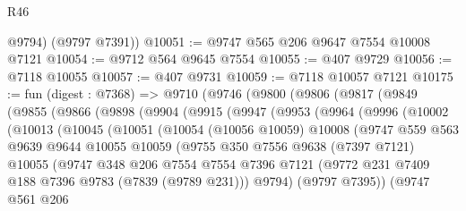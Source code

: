 \begin{lexlean}{R46}
\begin{coremodule}
        @9794)
      (@9797 @7391))
@10051 := @9747 @565 @206 @9647 @7554 @10008 @7121
@10054 := @9712 @564 @9645 @7554
@10055 := @407 @9729
@10056 := @7118 @10055
@10057 := @407 @9731
@10059 := @7118 @10057 @7121
@10175 := fun (digest : @7368) =>
  @9710
    (@9746
      (@9800
        (@9806
          (@9817
            (@9849
              (@9855
                (@9866
                  (@9898
                    (@9904
                      (@9915
                        (@9947
                          (@9953
                            (@9964
                              (@9996
                                (@10002
                                  (@10013
                                    (@10045
                                      (@10051
                                        (@10054
                                          (@10056 @10059)
                                          @10008
                                          (@9747
                                            @559
                                            @563
                                            @9639
                                            @9644
                                            @10055
                                            @10059
                                            (@9755
                                              @350
                                              @7556
                                              @9638
                                              (@7397 @7121)
                                              @10055
                                              (@9747
                                                @348
                                                @206
                                                @7554
                                                @7554
                                                @7396
                                                @7121
                                                (@9772
                                                  @231
                                                  @7409
                                                  @188
                                                  @7396
                                                  @9783
                                                  (@7839 (@9789 @231)))
                                                @9794)
                                              (@9797 @7395))
                                            (@9747
                                              @561
                                              @206

\end{coremodule}
\end{lexlean}
